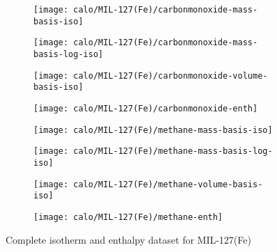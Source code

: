 \begin{figure}[H]
    \begin{subfigure}{0.25\textwidth}
        \texttt{[image: calo/MIL-127(Fe)/carbonmonoxide-mass-basis-iso]}%
        \label{appx:fig:shaping:mil127comass}
    \end{subfigure}%
    \begin{subfigure}{0.25\textwidth}
        \texttt{[image: calo/MIL-127(Fe)/carbonmonoxide-mass-basis-log-iso]}%
        \label{appx:fig:shaping:mil127comasslog}
    \end{subfigure}%
    \begin{subfigure}{0.25\textwidth}
        \texttt{[image: calo/MIL-127(Fe)/carbonmonoxide-volume-basis-iso]}%
        \label{appx:fig:shaping:mil127covolume}
    \end{subfigure}%
    \begin{subfigure}{0.25\textwidth}
        \texttt{[image: calo/MIL-127(Fe)/carbonmonoxide-enth]}%
        \label{appx:fig:shaping:mil127coenth}
    \end{subfigure}%

    \begin{subfigure}{0.25\textwidth}
        \texttt{[image: calo/MIL-127(Fe)/methane-mass-basis-iso]}%
        \label{appx:fig:shaping:mil127ch4mass}
    \end{subfigure}%
    \begin{subfigure}{0.25\textwidth}
        \texttt{[image: calo/MIL-127(Fe)/methane-mass-basis-log-iso]}%
        \label{appx:fig:shaping:mil127ch4masslog}
    \end{subfigure}%
    \begin{subfigure}{0.25\textwidth}
        \texttt{[image: calo/MIL-127(Fe)/methane-volume-basis-iso]}%
        \label{appx:fig:shaping:mil127ch4volume}
    \end{subfigure}%
    \begin{subfigure}{0.25\textwidth}
        \texttt{[image: calo/MIL-127(Fe)/methane-enth]}%
        \label{appx:fig:shaping:mil127ch4enth}
    \end{subfigure}%

    \caption{Complete isotherm and enthalpy dataset for MIL-127(Fe)}
    
\end{figure}


